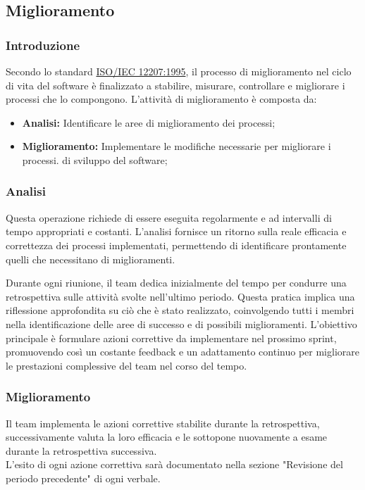 \subsection{Miglioramento}
\subsubsection{Introduzione}
Secondo lo standard \href{https://www.math.unipd.it/~tullio/IS-1/2009/Approfondimenti/ISO_12207-1995.pdf}{ISO/IEC 12207:1995}, il processo di miglioramento nel ciclo di vita del software è finalizzato a stabilire, misurare, controllare e migliorare i processi che lo compongono.
L'attività di miglioramento è composta da:
 \begin{itemize}
    \item \textbf{Analisi:} Identificare le aree di miglioramento dei processi;
    \item  \textbf{Miglioramento:} Implementare le modifiche necessarie per migliorare i processi.
    di sviluppo del software;
 \end{itemize}
 \subsubsection{Analisi}
Questa operazione richiede di essere eseguita regolarmente e ad intervalli di tempo appropriati e costanti. L'analisi fornisce un ritorno sulla reale efficacia e correttezza dei processi implementati, permettendo di identificare prontamente quelli che necessitano di miglioramenti.

\vspace*{0.1cm}

Durante ogni riunione, il team dedica inizialmente del tempo per condurre una retrospettiva sulle attività svolte nell'ultimo periodo. Questa pratica implica una riflessione approfondita su ciò che è stato realizzato, coinvolgendo tutti i membri nella identificazione delle aree di successo e di possibili miglioramenti. L'obiettivo principale è formulare azioni correttive da implementare nel prossimo sprint, promuovendo così un costante feedback e un adattamento continuo per migliorare le prestazioni complessive del team nel corso del tempo.
 \subsubsection{Miglioramento}
 Il team implementa le azioni correttive stabilite durante la retrospettiva, successivamente valuta la loro efficacia e le sottopone nuovamente a esame durante la retrospettiva successiva.\\
L'esito di ogni azione correttiva sarà documentato nella sezione "Revisione del periodo precedente" di ogni verbale.
